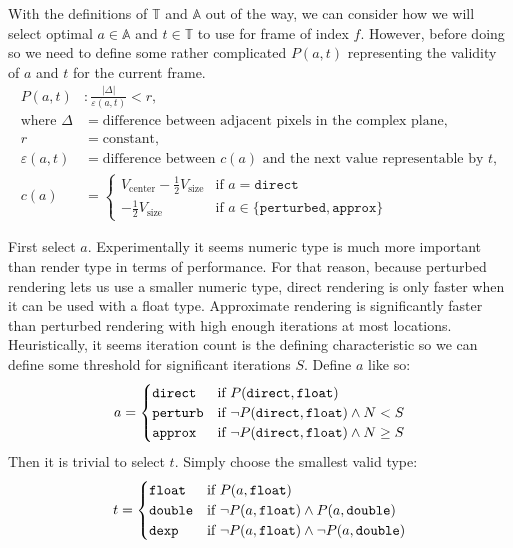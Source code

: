 \documentclass{article}
\begin{document}
\par With the definitions of $\mathbb{T}$ and $\mathbb{A}$ out of the way, we can consider how we will select optimal $a\in\mathbb{A}$ and $t\in\mathbb{T}$ to use for frame of index $f$. However, before doing so we need to define some rather complicated $P(a,t)$ representing the validity of $a$ and $t$ for the current frame.
\[
\begin{aligned}
    P(a,t) &: \frac{|\Delta|}{\varepsilon(a,t)} < r, \\
    \text{where } \Delta &= \text{difference between adjacent pixels in the complex plane}, \\
    r &= \text{constant}, \\
    \varepsilon(a,t) &= \text{difference between } c(a) \text{ and the next value representable by } t, \\
    c(a) &= \begin{cases}
        V_\text{center} - \frac{1}{2}V_\text{size} & \text{if } a = \texttt{direct} \\
        -\frac{1}{2}V_\text{size} & \text{if } a \in \{\texttt{perturbed}, \texttt{approx}\}
    \end{cases}
\end{aligned}
\]
\par First select $a$. Experimentally it seems numeric type is much more important than render type in terms of performance. For that reason, because perturbed rendering lets us use a smaller numeric type, direct rendering is only faster when it can be used with a float type. Approximate rendering is significantly faster than perturbed rendering with high enough iterations at most locations. Heuristically, it seems iteration count is the defining characteristic so we can define some threshold for significant iterations $S$. Define $a$ like so:
\[
    a = \begin{cases}
        \verb|direct| & \text{if } P(\verb|direct|, \verb|float|) \\
        \verb|perturb| & \text{if }  \lnot P(\verb|direct|, \verb|float|) \land N<S\\
        \verb|approx| & \text{if } \lnot P(\verb|direct|, \verb|float|) \land N \geq S \\
    \end{cases}
\]
Then it is trivial to select $t$. Simply choose the smallest valid type:
\[
    t = \begin{cases} 
        \verb|float| & \text{if } P(a, \verb|float|) \\
        \verb|double| & \text{if }  \lnot P(a, \verb|float|) \land P(a, \verb|double|) ~\\
        \verb|dexp| & \text{if } \lnot P(a, \verb|float|) \land \lnot P(a, \verb|double|) 
    \end{cases}
\]
\end{document}
